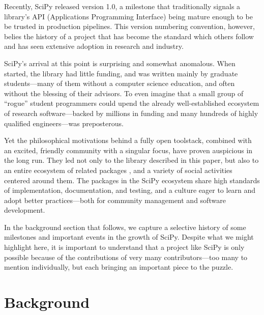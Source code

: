 \documentclass[fleqn,10pt]{wlscirep}
\begin{document}
Recently, SciPy released version 1.0, a milestone that traditionally
signals a library's API (Applications Programming Interface) being
mature enough to be be trusted in production pipelines. This version 
numbering convention, however, belies the history of a project that has
become the standard which others follow and has seen extensive
adoption in research and industry.

SciPy's arrival at this point is surprising and somewhat anomalous.
When started, the library had little funding, and was written mainly
by graduate students---many of them without a computer science education, and often without the
blessing of their advisors.  To even imagine that a small group of
``rogue'' student programmers could upend the already well-established
ecosystem of research software---backed by millions in funding and
many hundreds of highly qualified engineers\cite{mathworks-globe-97,
esri-revenue,bloom-wolfram}---was preposterous.

Yet the philosophical motivations behind a fully open toolstack, combined
with an excited, friendly community with a singular focus, have
proven auspicious in the long run.  They led not only to the library
described in this paper, but also to an entire ecosystem of related
packages \cite{scipy-ecosystem}, and a variety of social activities centered around
them\cite{social-python}. The packages in the SciPy ecosystem 
share high standards of implementation,
documentation, and testing, and a culture eager to learn and adopt
better practices---both for community management and software
development.


In the background section that follows, we capture a selective history
of some milestones and important events in the growth of SciPy.
Despite what we might highlight here, it is important to understand
that a project like SciPy is only possible because of the
contributions of very many contributors---too many to mention
individually, but each bringing an important piece to the puzzle.

\section*{Background}
\end{document}
